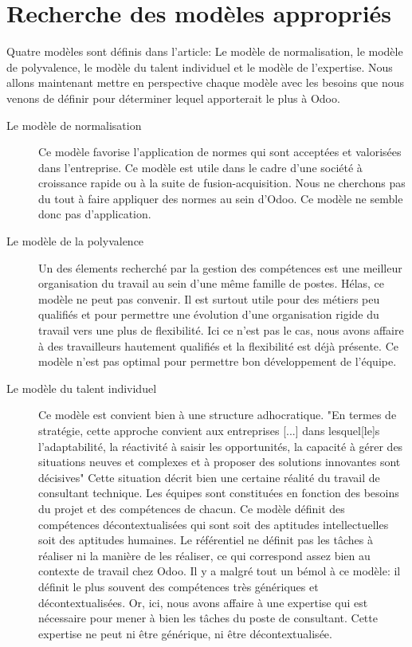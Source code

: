 \section{Recherche des modèles appropriés}
Quatre modèles sont définis dans l'article\citep[pp.39-49]{delobbe}: Le modèle de normalisation, le modèle de polyvalence, le modèle du talent individuel et le modèle de l'expertise. Nous allons maintenant mettre en perspective chaque modèle avec les besoins que nous venons de définir pour déterminer lequel apporterait le plus à Odoo.
\begin{description}
  \item[Le modèle de normalisation]
  Ce modèle favorise l'application de normes qui sont acceptées et valorisées dans l'entreprise. Ce modèle est utile dans le cadre d'une société à croissance rapide ou à la suite de fusion-acquisition. Nous ne cherchons pas du tout à faire appliquer des normes au sein d'Odoo. Ce modèle ne semble donc pas d'application. 
  \item[Le modèle de la polyvalence]
  Un des élements recherché par la gestion des compétences est une meilleur organisation du travail au sein d'une même famille de postes. Hélas, ce modèle ne peut pas convenir. Il est surtout utile pour des métiers peu qualifiés et pour permettre une évolution d'une organisation rigide du travail vers une plus de flexibilité. Ici ce n'est pas le cas, nous avons affaire à des travailleurs hautement qualifiés et la flexibilité est déjà présente. Ce modèle n'est pas optimal pour permettre bon développement de l'équipe. 
  \item[Le modèle du talent individuel]
  Ce modèle est convient bien à une structure adhocratique. "En termes de stratégie, cette approche convient aux entreprises [...] dans lesquel[le]s l'adaptabilité, la réactivité à saisir les opportunités, la capacité à gérer des situations neuves et complexes et à proposer des solutions innovantes sont décisives"\citep[pp.44]{delobbe} Cette situation décrit bien une certaine réalité du travail de consultant technique. Les équipes sont constituées en fonction des besoins du projet et des compétences de chacun. Ce modèle définit des compétences décontextualisées qui sont soit des aptitudes intellectuelles soit des aptitudes humaines. Le référentiel ne définit pas les tâches à réaliser ni la manière de les réaliser, ce qui correspond assez bien au contexte de travail chez Odoo. Il y a malgré tout un bémol à ce modèle: il définit le plus souvent des compétences très génériques et décontextualisées. Or, ici, nous avons affaire à une expertise qui est nécessaire pour mener à bien les tâches du poste de consultant. Cette expertise ne peut ni être générique, ni être décontextualisée. 

\end{description}
